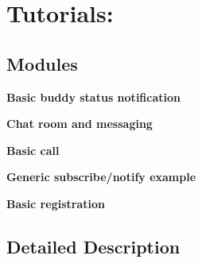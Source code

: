 \section{Tutorials\-:}
\label{group__tutorials}
\subsection*{Modules}
\begin{DoxyCompactItemize}
\item 
{\bf Basic buddy status notification}
\item 
{\bf Chat room and messaging}
\item 
{\bf Basic call}
\item 
{\bf Generic subscribe/notify example}
\item 
{\bf Basic registration}
\end{DoxyCompactItemize}


\subsection{Detailed Description}
